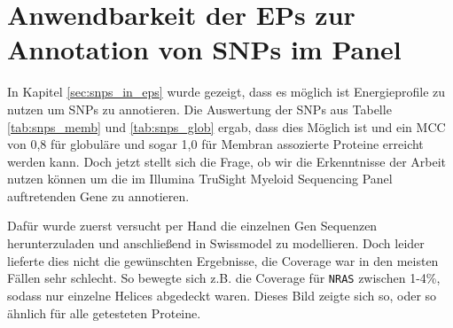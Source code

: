\section{Anwendbarkeit der EPs zur Annotation von SNPs im Panel}

In Kapitel \ref{sec:snps_in_eps} wurde gezeigt, dass es möglich ist Energieprofile zu nutzen um \ac{SNP}s zu annotieren.  Die Auswertung der \ac{SNP}s aus Tabelle \ref{tab:snps_memb} und \ref{tab:snps_glob} ergab, dass dies Möglich ist und ein MCC von 0,8 für globuläre und sogar 1,0 für Membran assozierte Proteine erreicht werden kann. Doch jetzt stellt sich die Frage, ob wir die Erkenntnisse der Arbeit nutzen können um die im Illumina TruSight Myeloid Sequencing Panel auftretenden Gene zu annotieren. 

Dafür wurde zuerst versucht per Hand die einzelnen Gen Sequenzen herunterzuladen und anschließend in Swissmodel zu modellieren. Doch leider lieferte dies nicht die gewünschten Ergebnisse, die Coverage war in den meisten Fällen sehr schlecht. So bewegte sich z.B. die Coverage für \texttt{NRAS} zwischen 1-4\%, sodass nur einzelne Helices abgedeckt waren. Dieses Bild zeigte sich so, oder so ähnlich für alle getesteten Proteine. 

\begin{table}[]
    \centering
    \caption{Illumina TruSight Myeloid Sequencing Panel Gene \emph{coverage}, Transkriptlänge ist mit UTRs und CDS angegeben.}
    \label{tab:illumina_coverage}
\end{table}

